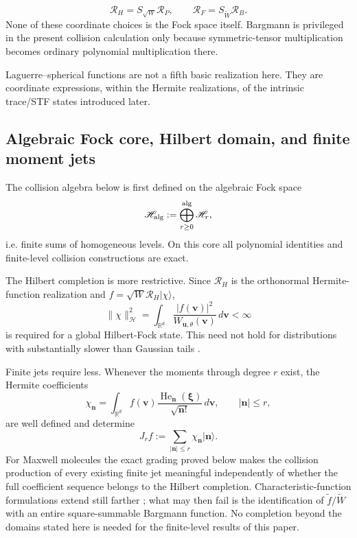 \documentclass[11pt,oneside]{article}
\numberwithin{equation}{section}
\theoremstyle{definition}
\begin{document}
\begin{equation}
\mathcal R_H=S_{\sqrt W}\mathcal R_P,
\qquad
\mathcal R_F=S_{\widetilde W}\mathcal R_B.
\label{eq:maxwell_parallel_realization_pairs}
\end{equation}
None of these coordinate choices is the Fock space itself.  Bargmann is privileged in the present collision calculation only because symmetric-tensor multiplication becomes ordinary polynomial multiplication there.

Laguerre--spherical functions are not a fifth basic realization here.  They are coordinate expressions, within the Hermite realizations, of the intrinsic trace/STF states introduced later.

\subsection{Algebraic Fock core, Hilbert domain, and finite moment jets}
\label{subsec:maxwell_fock_domain}

The collision algebra below is first defined on the algebraic Fock space
\begin{equation}
\mathscr H_{\rm alg}
:=\bigoplus_{r\ge0}^{\rm alg}\mathscr H_r,
\label{eq:maxwell_algebraic_fock_core}
\end{equation}
i.e. finite sums of homogeneous levels.  On this core all polynomial identities and finite-level collision constructions are exact.

The Hilbert completion is more restrictive.  Since $\mathcal R_H$ is the orthonormal Hermite-function realization and $f=\sqrt W \mathcal R_H|\chi\rangle$,
\begin{equation}
\|\chi\|_{\mathscr H}^2
=\int_{\mathbb R^d}\frac{|f(\bm v)|^2}{W_{\bm u,\theta}(\bm v)}\,d\bm v<\infty
\label{eq:maxwell_fock_hilbert_domain}
\end{equation}
is required for a global Hilbert-Fock state.  This need not hold for distributions with substantially slower than Gaussian tails \cite{Tang1993Hermite,SarnaGiesselmannTorrilhon2020}.

Finite jets require less.  Whenever the moments through degree $r$ exist, the Hermite coefficients
\begin{equation}
\chi_{\bm n}
=\int_{\mathbb R^d}f(\bm v)
\frac{\operatorname{He}_{\bm n}(\bm\xi)}{\sqrt{\bm n!}}\,d\bm v,
\qquad |\bm n|\le r,
\label{eq:maxwell_finite_moment_coefficients}
\end{equation}
are well defined and determine
\begin{equation}
J_r f:=\sum_{|\bm n|\le r}\chi_{\bm n}|\bm n\rangle.
\label{eq:maxwell_fock_jet}
\end{equation}
For Maxwell molecules the exact grading proved below makes the collision production of every existing finite jet meaningful independently of whether the full coefficient sequence belongs to the Hilbert completion.  Characteristic-function formulations extend still farther \cite{CannoneKarch2010,ChoMorimotoWangYang2016}; what may then fail is the identification of $\widetilde f/\widetilde W$ with an entire square-summable Bargmann function.  No completion beyond the domains stated here is needed for the finite-level results of this paper.
\end{document}
